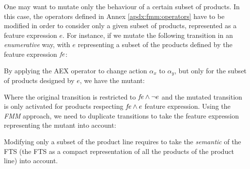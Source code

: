 One may want to mutate only the behaviour of a certain subset of products. In this case, the operators defined in Annex \ref{apdx:fmm:operators} have to be modified in order to consider only a given subset of products, represented as a feature expression $e$. For instance, if we mutate the following transition in an \emph{enumerative} way, with $e$ representing a subset of the products defined by the feature expression $\mathit{fe}$:
\begin{center}
\end{center}
By applying the AEX operator to change action $\alpha_x$ to $\alpha_y$, but only for the subset of products designed by $e$, we have the mutant:
\begin{center}
\end{center}
Where the original transition is restricted to $ \mathit{fe} \wedge \neg e$ and the mutated transition is only activated for products respecting $\mathit{fe} \wedge e$ feature expression.
Using the \emph{\gls{FMM}} approach, we need to duplicate transitions to take the feature expression representing the mutant into account:
\begin{center}
\end{center}
Modifying only a subset of the product line requires to take the \emph{semantic} of the FTS (\ie the FTS as a compact representation of all the products of the product line) into account.

